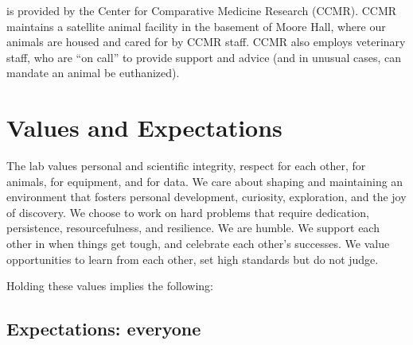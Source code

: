 \documentclass{tufte-book}
\begin{document}
 is provided by the Center for
Comparative Medicine Research (CCMR). CCMR maintains a satellite
animal facility in the basement of Moore Hall, where our animals are
housed and cared for by CCMR staff. CCMR also employs veterinary
staff, who are ``on call'' to provide support and advice (and in
unusual cases, can mandate an animal be euthanized).


\chapter{Values and Expectations}\label{ch:expectations}

The lab values personal and scientific integrity, respect for each
other, for animals, for equipment, and for data. We care about shaping
and maintaining an environment that fosters personal development,
curiosity, exploration, and the joy of discovery. We choose to work on
hard problems that require dedication, persistence, resourcefulness,
and resilience. We are humble. We support each other in when things
get tough, and celebrate each other's successes. We value
opportunities to learn from each other, set high standards but do not
judge.

Holding these values implies the following:

\section{Expectations: everyone}
\end{document}
